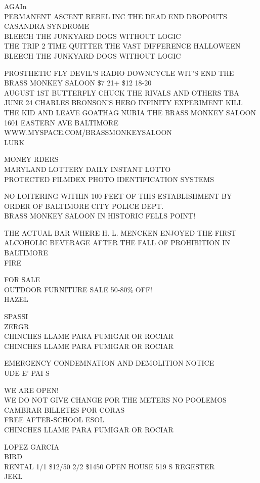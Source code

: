 \documentclass[10pt,letterpaper]{article}
\begin{document}
AGAIn\\
PERMANENT ASCENT REBEL INC THE DEAD END DROPOUTS CASANDRA SYNDROME\\
BLEECH THE JUNKYARD DOGS WITHOUT LOGIC\\
THE TRIP 2 TIME QUITTER THE VAST DIFFERENCE HALLOWEEN BLEECH THE JUNKYARD DOGS WITHOUT LOGIC

PROSTHETIC FLY DEVIL'S RADIO DOWNCYCLE WIT'S END THE BRASS MONKEY SALOON \$7 21+ \$12 18{-}20\\
AUGUST 1ST BUTTERFLY CHUCK THE RIVALS AND OTHERS TBA\\
JUNE 24 CHARLES BRONSON'S HERO INFINITY EXPERIMENT KILL THE KID AND LEAVE GOATHAG NURIA THE BRASS MONKEY SALOON 1601 EASTERN AVE BALTIMORE WWW.MYSPACE.COM/BRASSMONKEYSALOON\\
LURK

MONEY RDERS\\
MARYLAND LOTTERY DAILY INSTANT LOTTO\\
PROTECTED FILMDEX PHOTO IDENTIFICATION SYSTEMS

NO LOITERING WITHIN 100 FEET OF THIS ESTABLISHMENT BY ORDER OF BALTIMORE CITY POLICE DEPT.\\
BRASS MONKEY SALOON IN HISTORIC FELLS POINT!

THE ACTUAL BAR WHERE H. L. MENCKEN ENJOYED THE FIRST ALCOHOLIC BEVERAGE AFTER THE FALL OF PROHIBITION IN BALTIMORE\\
FIRE

FOR SALE\\
OUTDOOR FURNITURE SALE 50{-}80\% OFF!\\
HAZEL

SPASSI\\
ZERGR\\
CHINCHES LLAME PARA FUMIGAR OR ROCIAR\\
CHINCHES LLAME PARA FUMIGAR OR ROCIAR

EMERGENCY CONDEMNATION AND DEMOLITION NOTICE\\
UDE E' PAI S

WE ARE OPEN!\\
WE DO NOT GIVE CHANGE FOR THE METERS NO POOLEMOS CAMBRAR BILLETES POR CORAS\\
FREE AFTER{-}SCHOOL ESOL\\
CHINCHES LLAME PARA FUMIGAR OR ROCIAR

LOPEZ GARCIA\\
BIRD\\
RENTAL 1/1 \$12/50 2/2 \$1450 OPEN HOUSE 519 S REGESTER\\
JEKL
\end{document}
